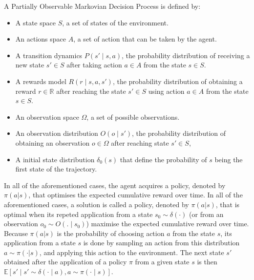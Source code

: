 \begin{definition}[POMDP]
    A Partially Observable Markovian Decision Process is defined by:
    \begin{itemize}
        \item A state space $S$, a set of states of the environment.
        \item An actions space $A$, a set of action that can be taken by the agent.
        \item A transition dynamics $P(s' \mid s,a)$, the probability distribution of receiving a new state $s' \in S$ after
    taking action $a \in A$ from the state $s \in S$.
        \item A rewards model $R(r \mid s, a, s')$, the probability distribution of obtaining a reward $r\in \mathbb{R}$ after
    reaching the state $s' \in S$ using action $a \in A$ from the state $s \in S$.
        \item An observation space $\Omega$, a set of possible observations.
        \item An observation distribution $O(o \mid s')$, the probability distribution of obtaining an observation $o \in \Omega$
    after reaching state $s' \in S$,
        \item A initial state distribution $\delta_0(s)$ that define the probability of $s$ being the first state of the
        trajectory. %
    \end{itemize}
\end{definition}

In all of the aforementioned cases, the agent acquires a policy, denoted by $\pi(a|s)$, that optimises the expected
cumulative reward over time.
In all of the aforementioned cases, a solution is called a policy, denoted by $\pi(a|s)$, that is optimal when its repeted application from a state 
$s_0 \sim \delta(\cdot)$ (or from an observation $o_0 \sim O(. \mid s_0)$) maximise the expected cumulative reward over time.
Because $\pi(a|s)$ is the probability of choosing action $a$ from the state $s$, its application from a state $s$ is done by sampling an action from this 
distribution $a \sim \pi(\cdot |s)$, and applying this action to the environment. 
The next state $s'$ obtained after the application of a policy $\pi$ from a given state $s$ is then 
$\mathbb{E} \left[ s' \mid s' \sim \delta(\cdot \mid a), a \sim \pi(\cdot \mid s)\right]$.

